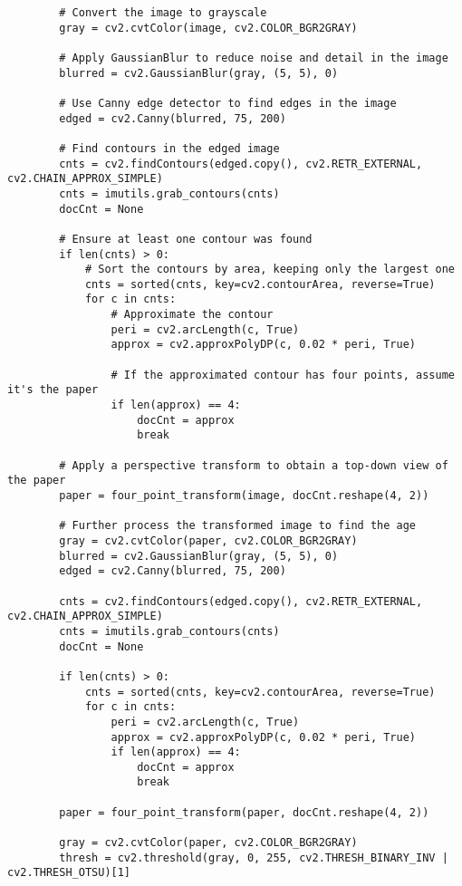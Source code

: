 \begin{lstlisting}
        # Convert the image to grayscale
        gray = cv2.cvtColor(image, cv2.COLOR_BGR2GRAY)
        
        # Apply GaussianBlur to reduce noise and detail in the image
        blurred = cv2.GaussianBlur(gray, (5, 5), 0)
        
        # Use Canny edge detector to find edges in the image
        edged = cv2.Canny(blurred, 75, 200)
    
        # Find contours in the edged image
        cnts = cv2.findContours(edged.copy(), cv2.RETR_EXTERNAL, cv2.CHAIN_APPROX_SIMPLE)
        cnts = imutils.grab_contours(cnts)
        docCnt = None
    
        # Ensure at least one contour was found
        if len(cnts) > 0:
            # Sort the contours by area, keeping only the largest one
            cnts = sorted(cnts, key=cv2.contourArea, reverse=True)
            for c in cnts:
                # Approximate the contour
                peri = cv2.arcLength(c, True)
                approx = cv2.approxPolyDP(c, 0.02 * peri, True)
                
                # If the approximated contour has four points, assume it's the paper
                if len(approx) == 4:
                    docCnt = approx
                    break
    
        # Apply a perspective transform to obtain a top-down view of the paper
        paper = four_point_transform(image, docCnt.reshape(4, 2))
    
        # Further process the transformed image to find the age
        gray = cv2.cvtColor(paper, cv2.COLOR_BGR2GRAY)
        blurred = cv2.GaussianBlur(gray, (5, 5), 0)
        edged = cv2.Canny(blurred, 75, 200)
    
        cnts = cv2.findContours(edged.copy(), cv2.RETR_EXTERNAL, cv2.CHAIN_APPROX_SIMPLE)
        cnts = imutils.grab_contours(cnts)
        docCnt = None
    
        if len(cnts) > 0:
            cnts = sorted(cnts, key=cv2.contourArea, reverse=True)
            for c in cnts:
                peri = cv2.arcLength(c, True)
                approx = cv2.approxPolyDP(c, 0.02 * peri, True)
                if len(approx) == 4:
                    docCnt = approx
                    break
    
        paper = four_point_transform(paper, docCnt.reshape(4, 2))
    
        gray = cv2.cvtColor(paper, cv2.COLOR_BGR2GRAY)
        thresh = cv2.threshold(gray, 0, 255, cv2.THRESH_BINARY_INV | cv2.THRESH_OTSU)[1]
        

\end{lstlisting}
